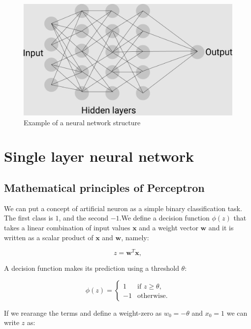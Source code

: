 \documentclass[a4paper,oneside,openright,11pt]{book}
\begin{document}
\begin{figure}[h]
\centering
\includegraphics[scale=0.3]{DocumentFigures/MyFigures/sieci2.png}
\caption{Example of a neural network structure \cite{NNSchematic}}
\end{figure}

\section{Single layer neural network}

\subsection{Mathematical principles of Perceptron}

We can put a concept of artificial neuron as a simple binary classification task. The first class is $1$, and the second $-1$.We define a decision function $\phi(z)$ that takes a linear combination of input values $\textbf{x}$ and a weight vector $\textbf{w}$ and it is written as a scalar product of $\textbf{x}$ and $\textbf{w}$, namely:


\begin{equation*}
    z = \textbf{w}^{T}\textbf{x},
\end{equation*}

A decision function makes its prediction using a threshold $\theta$:

\begin{equation}
    \phi(z) = 
\begin{cases}
     1  & \text{if } z \geq \theta, \\
-1  & \text{otherwise.}
\end{cases}
\end{equation}

If we rearange the terms and define a weight-zero as $w_{0} = - \theta$ and $x_{0} = 1$ we can write $z$ as:
\end{document}
